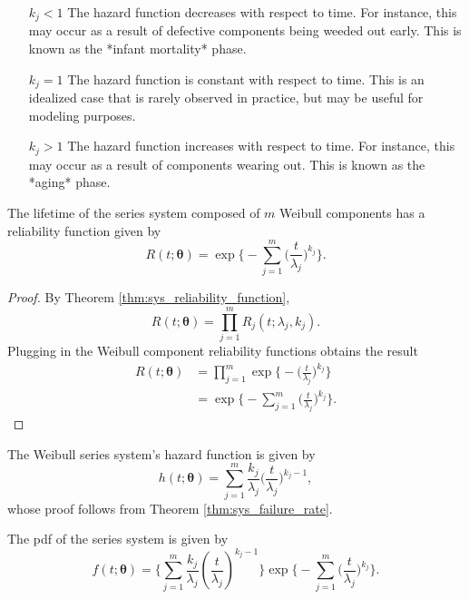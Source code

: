 \documentclass[
]{article}
\begin{document}
\begin{enumerate}
\item[$k_j < 1$] The hazard function decreases with respect to time. For instance,
  this may occur as a result of defective components being weeded out early. This
  is known as the *infant mortality* phase.
\item[$k_j = 1$] The hazard function is constant with respect to time. This is an
  idealized case that is rarely observed in practice, but may be useful for modeling
  purposes.
\item[$k_j > 1$] The hazard function increases with respect to time. For instance,
  this may occur as a result of components wearing out. This is known as the
  *aging* phase.
\end{enumerate}

The lifetime of the series system composed of \(m\) Weibull components
has a reliability function given by \begin{equation}
\label{eq:sys_weibull_reliability_function}
R(t;\boldsymbol{\theta}) = \exp\biggl\{-\sum_{j=1}^{m}\biggl(\frac{t}{\lambda_j}\biggr)^{k_j}\biggr\}.
\end{equation}

\begin{proof}
By Theorem \ref{thm:sys_reliability_function},
$$
R(t;\boldsymbol{\theta}) = \prod_{j=1}^{m} R_j(t;\lambda_j,k_j).
$$
Plugging in the Weibull component reliability functions obtains the result
\begin{align*}
R(t;\boldsymbol{\theta})
    &= \prod_{j=1}^{m} \exp\biggl\{-\biggl(\frac{t}{\lambda_j}\biggr)^{k_j}\biggr\}\\
    &= \exp\biggl\{-\sum_{j=1}^{m}\biggl(\frac{t}{\lambda_j}\biggr)^{k_j}\biggr\}.
\end{align*}
\end{proof}

The Weibull series system's hazard function is given by \begin{equation}
\label{eq:sys_weibull_failure_rate_function}
h(t;\boldsymbol{\theta}) =
    \sum_{j=1}^{m} \frac{k_j}{\lambda_j}\biggl(\frac{t}{\lambda_j}\biggr)^{k_j-1},
\end{equation} whose proof follows from Theorem
\ref{thm:sys_failure_rate}.

The pdf of the series system is given by \begin{equation}
\label{eq:sys_weibull_pdf}
f(t;\boldsymbol{\theta}) =
\biggl\{
    \sum_{j=1}^m \frac{k_j}{\lambda_j}\left(\frac{t}{\lambda_j}\right)^{k_j-1}
\biggr\}
\exp
\biggl\{
    -\sum_{j=1}^m \bigl(\frac{t}{\lambda_j}\bigr)^{k_j}
\biggr\}.
\end{equation}
\end{document}
